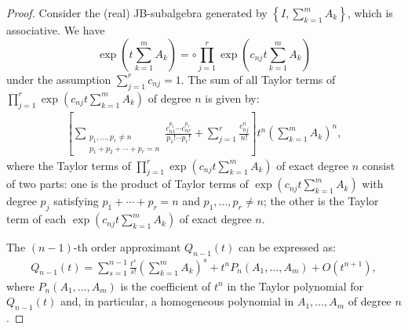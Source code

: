 \documentclass{article}
\theoremstyle{plain} %
\numberwithin{equation}{section}
\begin{document}
\begin{proof}
Consider the (real) JB-subalgebra generated by $\displaystyle \left\{I, \sum_{k=1}^m A_k\right\}$, which is associative. We have
\begin{equation}\label{eqt:taylor:product}
 \exp\left(t\sum_{k=1}^m A_k\right)=\circ \prod_{j=1}^r \exp\left(c_{nj} t\sum_{k=1}^m A_k\right) 	
\end{equation}
under the assumption  $\displaystyle \sum_{j=1}^r c_{nj}=1.$ 
The sum of all Taylor terms of 
$\displaystyle \prod_{j=1}^r \exp\left(c_{nj} t \sum_{k=1}^m A_k\right)$ of degree $n$ is given by:
\begin{align}\label{eqt:taylor:approximate n:exp}
  \left[\sum_{\substack{p_1, \dots, p_r \neq n \\ p_1 + p_2 + \cdots + p_r = n}} \frac{c_{n1}^{p_1} \cdots c_{nr}^{p_r}}{p_1! \cdots p_r!}  + \sum_{j=1}^r \frac{c_{nj}^n}{n!}\right] t^n \left(\sum_{k=1}^m A_k\right)^n,	
\end{align}
where the Taylor terms of $\displaystyle \prod_{j=1}^r \exp\left(c_{nj} t \sum_{k=1}^m A_k\right)$ of exact degree $n$ consist of two parts: one is the product of Taylor terms of $\displaystyle \exp\left(c_{nj} t \sum_{k=1}^m A_k\right)$ with degree $p_j$ satisfying $p_1 + \cdots + p_r = n$ and $p_1, \dots, p_r \neq n$; the other is the Taylor term of each $\displaystyle \exp\left(c_{nj} t \sum_{k=1}^m A_k\right)$ of exact degree $n$.

The $(n-1)$-th order approximant $Q_{n-1}(t)$ can be expressed as:
\begin{align}\label{eqt:taylor:qn-1}
Q_{n-1}(t) = \sum_{s=1}^{n-1} \frac{t^s}{s!} \left(\sum_{k=1}^m A_k\right)^s + t^n P_n(A_1, \dots, A_m) + O(t^{n+1}),	
\end{align}
where $P_n(A_1, \dots, A_m)$ is the coefficient of $t^n$ in the Taylor polynomial for $Q_{n-1}(t)$ and, in particular, a homogeneous polynomial in
$A_1, ..., A_m$ of degree $n$. 


\end{proof}
\end{document}
